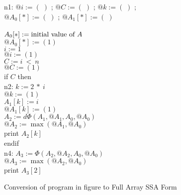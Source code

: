 \begin{figure}%
\begin{center}
\parbox{3.0in}{
\begin{programa}
\mbox{n1:}
\Tb $@i := (\;)$ ; $@C := (\;)$ ; $@k := (\;)$ ; \\
\Tb $@A_0[*] := (\;)$ ; $@A_1[*] := (\;)$\\
\\
\Tb $A_0[*] := \mbox{\rm initial value of $A$}$\\
\Tb $@A_0[*] := (1)$\\
\Tb $i := 1$ \\
\Tb $@i := (1)$ \\
\Tb $C := i\ <\ n $ \\
\Tb $@C := (1)$ \\
\Tb if $C$ then \\
\mbox{n2:}
\Tc $k :=  2\ *\ i$ \\
\Tc $@k := (1)$ \\
\Tc $A_1[k] := i$\\
\Tc $@A_1[k] := (1)$\\
\Tc $A_2 := d\Phi(A_1, @A_1, A_0, @A_0)$\\
\Tc $@A_2 := \max(@A_1, @A_0)$\\
\Tc print $A_2[k]$\\
\Tb endif \\
\mbox{n4:} 
\Tb $A_3 := \Phi(A_2, @A_2, A_0, @A_0)$\\
\Tb $@A_3 := \max(@A_2, @A_0)$\\
\Tb print $A_3[2]$ 
\end{programa}
}
\end{center}
\caption{Conversion of program in figure \protect{\ref{fig:ssa-acyclic-array}} to Full Array SSA Form}
\label{fig:full-form}
\end{figure}

